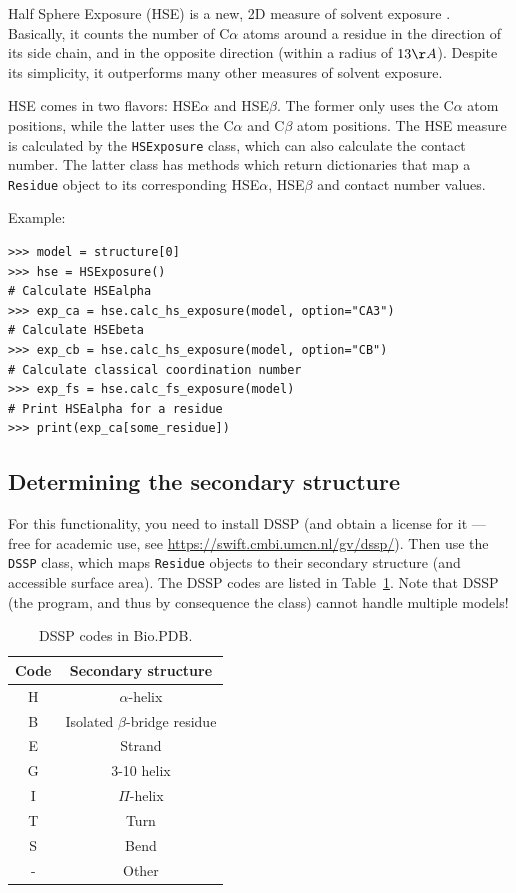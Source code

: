 Half Sphere Exposure (HSE) is a new, 2D measure of solvent exposure
\cite{hamelryck2005}.
Basically, it counts the number of C$\alpha$ atoms around a residue
in the direction of its side chain, and in the opposite direction
(within a radius of $13 \AA$). Despite its simplicity, it outperforms
many other measures of solvent exposure.

HSE comes in two flavors: HSE$\alpha$ and HSE$\beta$. The former
only uses the C$\alpha$ atom positions, while the latter uses the
C$\alpha$ and C$\beta$ atom positions. The HSE measure is calculated
by the \texttt{HSExposure} class, which can also calculate the contact
number. The latter class has methods which return dictionaries that
map a \texttt{Residue} object to its corresponding HSE$\alpha$, HSE$\beta$
and contact number values.

Example:

\begin{verbatim}
>>> model = structure[0]
>>> hse = HSExposure()
# Calculate HSEalpha
>>> exp_ca = hse.calc_hs_exposure(model, option="CA3")
# Calculate HSEbeta
>>> exp_cb = hse.calc_hs_exposure(model, option="CB")
# Calculate classical coordination number
>>> exp_fs = hse.calc_fs_exposure(model)
# Print HSEalpha for a residue
>>> print(exp_ca[some_residue])
\end{verbatim}

\subsection{Determining the secondary structure}

For this functionality, you need to install DSSP (and obtain a license
for it --- free for academic use, see \url{https://swift.cmbi.umcn.nl/gv/dssp/}).
Then use the \texttt{DSSP} class, which maps \texttt{Residue} objects
to their secondary structure (and accessible surface area). The DSSP
codes are listed in Table~\ref{table:DSSP-codes}. Note that DSSP (the
program, and thus by consequence the class) cannot handle multiple
models!

\begin{table}
\begin{tabular}{|c|c|}
\hline
Code&
Secondary structure \\
\hline
\hline
H&
$\alpha$-helix \\
\hline
B&
Isolated $\beta$-bridge residue \\
\hline
E&
Strand \\
\hline
G&
3-10 helix \\
\hline
I&
$\Pi$-helix \\
\hline
T&
Turn\\
\hline
S&
Bend \\
\hline
-&
Other\\
\hline
\end{tabular}
\caption{DSSP codes in Bio.PDB.}
\label{table:DSSP-codes}
\end{table}

